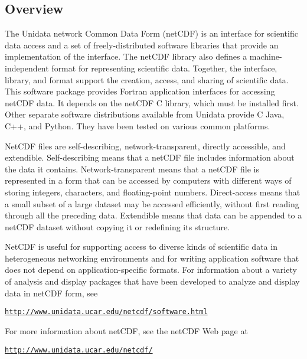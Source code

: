 \subsection*{Overview }

The Unidata network Common Data Form (net\+C\+DF) is an interface for scientific data access and a set of freely-\/distributed software libraries that provide an implementation of the interface. The net\+C\+DF library also defines a machine-\/independent format for representing scientific data. Together, the interface, library, and format support the creation, access, and sharing of scientific data. This software package provides Fortran application interfaces for accessing net\+C\+DF data. It depends on the net\+C\+DF C library, which must be installed first. Other separate software distributions available from Unidata provide C Java, C++, and Python. They have been tested on various common platforms.

Net\+C\+DF files are self-\/describing, network-\/transparent, directly accessible, and extendible. {\ttfamily Self-\/describing} means that a net\+C\+DF file includes information about the data it contains. {\ttfamily Network-\/transparent} means that a net\+C\+DF file is represented in a form that can be accessed by computers with different ways of storing integers, characters, and floating-\/point numbers. {\ttfamily Direct-\/access} means that a small subset of a large dataset may be accessed efficiently, without first reading through all the preceding data. {\ttfamily Extendible} means that data can be appended to a net\+C\+DF dataset without copying it or redefining its structure.

Net\+C\+DF is useful for supporting access to diverse kinds of scientific data in heterogeneous networking environments and for writing application software that does not depend on application-\/specific formats. For information about a variety of analysis and display packages that have been developed to analyze and display data in net\+C\+DF form, see


\begin{DoxyItemize}
\item \href{http://www.unidata.ucar.edu/netcdf/software.html}{\tt http\+://www.\+unidata.\+ucar.\+edu/netcdf/software.\+html}
\end{DoxyItemize}

For more information about net\+C\+DF, see the net\+C\+DF Web page at


\begin{DoxyItemize}
\item \href{http://www.unidata.ucar.edu/netcdf/}{\tt http\+://www.\+unidata.\+ucar.\+edu/netcdf/}
\end{DoxyItemize}

